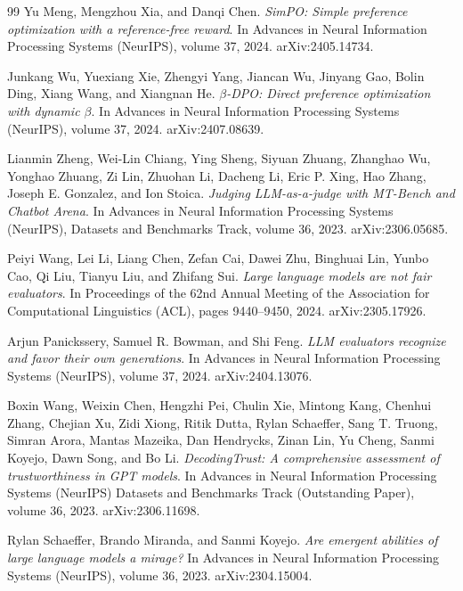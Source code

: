 \begin{thebibliography}{99}
Yu Meng, Mengzhou Xia, and Danqi Chen.
\textit{SimPO: Simple preference optimization with a reference-free reward}.
In Advances in Neural Information Processing Systems (NeurIPS), volume 37, 2024.
arXiv:2405.14734.

Junkang Wu, Yuexiang Xie, Zhengyi Yang, Jiancan Wu, Jinyang Gao, Bolin Ding, Xiang Wang, and Xiangnan He.
\textit{$\beta$-DPO: Direct preference optimization with dynamic $\beta$}.
In Advances in Neural Information Processing Systems (NeurIPS), volume 37, 2024.
arXiv:2407.08639.

Lianmin Zheng, Wei-Lin Chiang, Ying Sheng, Siyuan Zhuang, Zhanghao Wu, Yonghao Zhuang, Zi Lin, Zhuohan Li, Dacheng Li, Eric P. Xing, Hao Zhang, Joseph E. Gonzalez, and Ion Stoica.
\textit{Judging LLM-as-a-judge with MT-Bench and Chatbot Arena}.
In Advances in Neural Information Processing Systems (NeurIPS), Datasets and Benchmarks Track, volume 36, 2023.
arXiv:2306.05685.

Peiyi Wang, Lei Li, Liang Chen, Zefan Cai, Dawei Zhu, Binghuai Lin, Yunbo Cao, Qi Liu, Tianyu Liu, and Zhifang Sui.
\textit{Large language models are not fair evaluators}.
In Proceedings of the 62nd Annual Meeting of the Association for Computational Linguistics (ACL), pages 9440--9450, 2024.
arXiv:2305.17926.

Arjun Panickssery, Samuel R. Bowman, and Shi Feng.
\textit{LLM evaluators recognize and favor their own generations}.
In Advances in Neural Information Processing Systems (NeurIPS), volume 37, 2024.
arXiv:2404.13076.

Boxin Wang, Weixin Chen, Hengzhi Pei, Chulin Xie, Mintong Kang, Chenhui Zhang, Chejian Xu, Zidi Xiong, Ritik Dutta, Rylan Schaeffer, Sang T. Truong, Simran Arora, Mantas Mazeika, Dan Hendrycks, Zinan Lin, Yu Cheng, Sanmi Koyejo, Dawn Song, and Bo Li.
\textit{DecodingTrust: A comprehensive assessment of trustworthiness in GPT models}.
In Advances in Neural Information Processing Systems (NeurIPS) Datasets and Benchmarks Track (Outstanding Paper), volume 36, 2023.
arXiv:2306.11698.

Rylan Schaeffer, Brando Miranda, and Sanmi Koyejo.
\textit{Are emergent abilities of large language models a mirage?}
In Advances in Neural Information Processing Systems (NeurIPS), volume 36, 2023.
arXiv:2304.15004.


\end{thebibliography}
